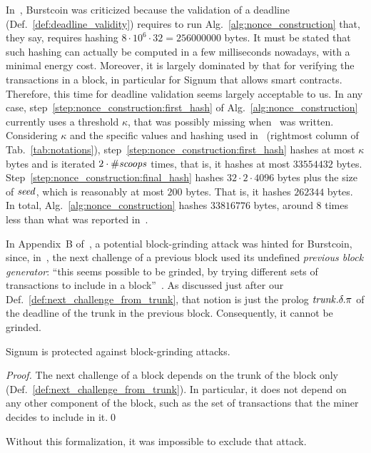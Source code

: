 In~\cite{ParkKFGAP18}, Burstcoin was criticized because the validation of a deadline
(Def.~\ref{def:deadline_validity}) requires to run
Alg.~\ref{alg:nonce_construction} that, they say,
requires hashing $8\cdot 10^6\cdot 32=256000000$ bytes.
It must be stated that
such hashing can actually be computed in a few milliseconds nowadays,
with a minimal energy cost. Moreover, it is largely dominated
by that for verifying the transactions in a block, in particular
for Signum that allows smart contracts.
Therefore, this time for deadline validation seems largely acceptable to us.
In any case, step~\ref{step:nonce_construction:first_hash} of
Alg.~\ref{alg:nonce_construction} currently uses a threshold $\kappa$,
that was possibly missing when~\cite{ParkKFGAP18} was written.
Considering $\kappa$ and the specific values and hashing
used in~\cite{SignumPlotting} (rightmost column of Tab.~\ref{tab:notations}),
step~\ref{step:nonce_construction:first_hash}
hashes at most $\kappa$ bytes and is iterated $2\cdot{\#\mathit{scoops}}$ times, that is,
it hashes at most $33554432$ bytes.
Step~\ref{step:nonce_construction:final_hash} hashes $32\cdot 2\cdot 4096$ bytes
plus the size of ${\mathit{seed}}$, which is reasonably at most $200$ bytes.
That is, it hashes $262344$ bytes. In total, Alg.~\ref{alg:nonce_construction}
hashes $33816776$ bytes, around $8$ times less than what was reported in~\cite{ParkKFGAP18}.

In Appendix~B of~\cite{ParkKFGAP18}, a potential block-grinding attack was hinted for Burstcoin,
since, in~\cite{SignumPlotting}, the next challenge of a previous block used its undefined
\emph{previous block generator}:
``this seems possible to be grinded, by trying
different sets of transactions to include in a block''~\cite{ParkKFGAP18}.
As discussed just after our Def.~\ref{def:next_challenge_from_trunk}, that notion is
just the prolog ${\mathit{trunk}}.\delta.\pi$ of the deadline of the trunk in the previous block.
Consequently, it cannot be grinded.
%
\begin{proposition}\label{prop:no_block_grinding}
Signum is protected against block-grinding attacks.
\end{proposition}
\begin{proof}
  The next challenge of a block depends on the trunk of the block only (Def.~\ref{def:next_challenge_from_trunk}).
  In particular, it does not depend on any other component of the block, such as the set of
  transactions that the miner decides to include in it.\qed
\end{proof}
%
Without this formalization, it was impossible to exclude that attack.

